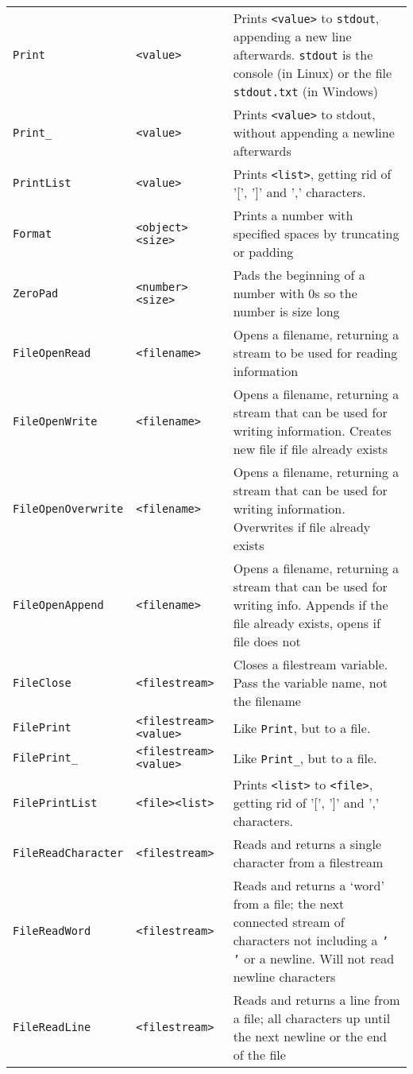 \begin{longtable}{p{3cm}p{3cm}p{6cm}}
\verb+Print+ &\verb+<value>+ &Prints \verb+<value>+ to \texttt{stdout}, appending a new line afterwards. \texttt{stdout} is the console (in Linux) or the file \texttt{stdout.txt} (in Windows)\\ 
\verb+Print_+ &\verb+<value>+ &Prints \verb+<value>+ to stdout, without appending a newline afterwards\\ 
\verb+PrintList+&\verb+<value>+ &Prints \verb+<list>+, getting rid of '[', ']' and ',' characters.\\ 
\verb+Format+ &\verb+<object>+ \verb+<size>+ &Prints a number with specified spaces by truncating or padding \\ 
\verb+ZeroPad+ &\verb+<number>+ \verb+<size>+ &Pads the beginning of a number with 0s so the number is size long\\
\verb+FileOpenRead+ &\verb+<filename>+ &Opens a filename, returning a stream to be used for reading information\\ 
\verb+FileOpenWrite+ &\verb+<filename>+ &Opens a filename, returning a stream that can be used for writing information. Creates new file if file already exists\\ 
\verb+FileOpenOverwrite+ &\verb+<filename>+ &Opens a filename, returning a stream that can be used for writing information. Overwrites if file already exists\\ 
\verb+FileOpenAppend+ &\verb+<filename>+ &Opens a filename, returning a stream that can be used for writing info. Appends if the file already exists, opens if file does not\\ 
\verb+FileClose+ &\verb+<filestream>+&Closes a filestream variable. Pass the variable name, not the filename\\ 
\verb+FilePrint+ &\verb+<filestream>+ \verb+<value>+ &Like \verb+Print+, but to a file.\\ 
\verb+FilePrint_+ &\verb+<filestream>+ \verb+<value>+ &Like \verb+Print_+, but to a file.\\ 
\verb+FilePrintList+&\verb+<file>+\verb+<list>+ &Prints \verb+<list>+ to \verb+<file>+, getting rid of '[', ']' and ',' characters.\\ 
\verb+FileReadCharacter+ &\verb+<filestream>+ &Reads and returns a single character from a filestream\\ 
\verb+FileReadWord+ &\verb+<filestream>+&Reads and returns a `word' from a file; the next connected stream of characters not including a \texttt{' '} or a newline. Will not read newline characters\\ 
\verb+FileReadLine+ &\verb+<filestream>+&Reads and returns a line from a file; all characters up until the next newline or the end of the file\\ 

\end{longtable}
